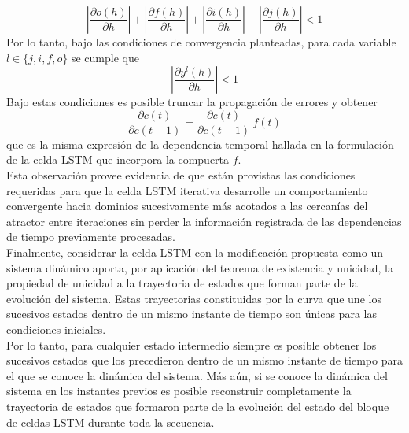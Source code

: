 \documentclass{article}
\begin{document}
	\begin{equation*}
	\left\lvert \dfrac{\partial o(h)}{\partial h} \right\rvert + \left\lvert \dfrac{\partial f(h)}{\partial h} \right\rvert + \left\lvert \dfrac{\partial i(h)}{\partial h} \right\rvert + \left\lvert \dfrac{\partial j(h)}{\partial h} \right\rvert <1
	\end{equation*}
	Por lo tanto, bajo las condiciones de convergencia planteadas, para cada variable $l \in \{j, i, f, o\}$ se cumple que
	\begin{equation*}
	\left\lvert \dfrac{\partial y^l(h)}{\partial h} \right\rvert <1
	\end{equation*}
	Bajo estas condiciones es posible truncar la propagación de errores y obtener
	\begin{equation*}
	\dfrac{\partial c(t)}{\partial c(t-1)} =  \dfrac{\partial c(t)}{\partial c(t-1)} \, f(t)
	\end{equation*}
	que es la misma expresión de la dependencia temporal hallada en la formulación de la celda LSTM que incorpora la compuerta $f$.\\
	Esta observación provee evidencia de que están provistas las condiciones requeridas para que la celda LSTM iterativa desarrolle un comportamiento convergente hacia dominios sucesivamente más acotados a las cercanías del atractor entre iteraciones sin perder la información registrada de las dependencias de tiempo previamente procesadas.\\
	
	Finalmente, considerar la celda LSTM con la modificación propuesta como un sistema dinámico aporta, por aplicación del teorema de existencia y unicidad, la propiedad de unicidad a la trayectoria de estados que forman parte de la evolución del sistema. Estas trayectorias constituidas por la curva que une los sucesivos estados dentro de un mismo instante de tiempo son únicas para las condiciones iniciales.\\
	Por lo tanto, para cualquier estado intermedio siempre es posible obtener los sucesivos estados que los precedieron dentro de un mismo instante de tiempo para el que se conoce la dinámica del sistema. Más aún, si se conoce la dinámica del sistema en los instantes previos es posible reconstruir completamente la trayectoria de estados que formaron parte de la evolución del estado del bloque de celdas LSTM durante toda la secuencia.
	
\end{document}
